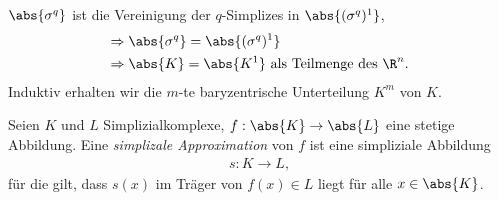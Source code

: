 \begin{bemn}[Klar]
$\abs{\sigma^q}$ ist die Vereinigung der $q$-Simplizes in $\abs{(\sigma^q)^1}$,
\begin{align*}
\Rightarrow\; & \abs{\sigma^q} = \abs{(\sigma^q)^1}\\
\Rightarrow\; &\abs{K} = \abs{K^1} \text{ als Teilmenge des }\R^n.
\end{align*}
Induktiv erhalten  wir die $m$-te baryzentrische Unterteilung $K^m$ von $K$.
\end{bemn}

\begin{defn}
\label{defn:4.2.3}
Seien $K$ und $L$ Simplizialkomplexe, $f: \abs{K}\to\abs{L}$ eine stetige Abbildung.
Eine \emph{simplizale Approximation} von $f$ ist eine simpliziale Abbildung
\begin{align*}
s: K\to L,
\end{align*}
für die gilt, dass $s(x)$ im Träger von $f(x)\in L$ liegt für alle
$x\in\abs{K}$.\fishhere
\end{defn}

